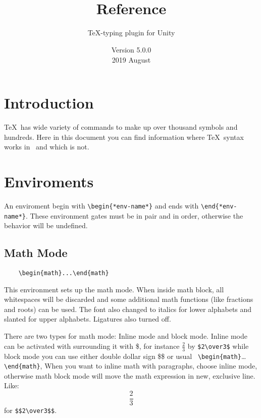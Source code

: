 \title{\TEXDraw\\ Reference}
\subtitle{\TeX-typing plugin for Unity}
\date{Version 5.0.0\\2019 August}



	\section{Introduction}
	\TeX\ has wide variety of commands to make up over thousand symbols and hundreds. Here in this document you can find information where \TeX\ syntax works in \TEXDraw\ and which is not.

	\section{Enviroments}

	An enviroment begin with \verb|\begin{*env-name*}| and ends with \verb|\end{*env-name*}|. These environment gates must be in pair and in order, otherwise the behavior will be undefined.

	\subsection{Math Mode}

	\begin{verbatim}
	\begin{math}...\end{math}
	\end{verbatim}

	This environment sets up the math mode. When inside math block, all whitespaces will be discarded and some additional math functions (like fractions and roots) can be used. The font also changed to italics for lower alphabets and slanted for upper alphabets. Ligatures also turned off.

	There are two types for math mode: Inline mode and block mode. Inline mode can be activated with surrounding it with \$, for instance $\frac{2}{3}$ by \verb|$2\over3$| while block mode you can use either double dollar sign \$\$ or usual \verb|	\begin{math}|\dots\verb|\end{math}|, When you want to inline math with paragraphs, choose inline mode, otherwise math block mode will move the math expression in new, exclusive line. Like: $$\frac{2}{3}$$ for \verb|$$2\over3$$|.

